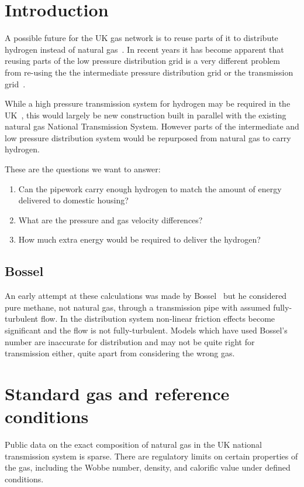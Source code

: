 \documentclass[5p]{elsarticle} %
\begin{document}
\section{Introduction}

A possible future for the UK gas network is to reuse parts of it to distribute hydrogen instead of natural gas~\citep{dodds2013,ARUP2023}. In recent years it has become apparent that reusing parts of the low pressure distribution grid is a very different problem from re-using the the intermediate pressure distribution grid or the transmission grid~\citep{H2Blends21,natgas2023}.

While a high pressure transmission system for hydrogen may be required in the UK~\citep{Samsatli2019}, this would largely be new construction built in parallel with the existing natural gas National Transmission System. However parts of the intermediate and low pressure distribution system would be repurposed from natural gas to carry hydrogen. 

These are the questions we want to answer:
\begin{enumerate}
\item Can the pipework carry enough hydrogen to match the amount of energy delivered to domestic housing?
\item What are the pressure and gas velocity differences?
\item How much extra energy would be required to deliver the hydrogen?
\end{enumerate}

\subsection{Bossel}

An early attempt at these calculations was made by Bossel~\citep{bossel2006} but he considered pure methane, not natural gas, through a transmission pipe with assumed fully-turbulent flow. In the distribution system  non-linear friction effects become significant and the flow is not fully-turbulent. Models which have used Bossel's number are  inaccurate for distribution and may not be quite right for transmission either, quite apart from considering the wrong gas.

\section{Standard gas and reference conditions}
\label{sec:standards}

Public data on the exact composition of natural gas in the UK national transmission system is sparse.
There are regulatory limits on certain properties of the gas, including the Wobbe  
number, density, and calorific value under defined conditions.
\end{document}
